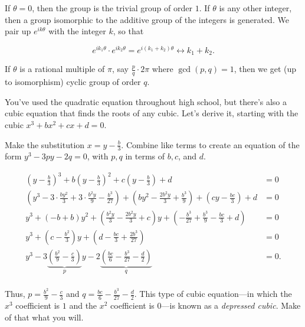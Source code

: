 \documentclass[../key.tex]{subfiles}
\begin{document}
If $\theta=0$, then the group is the trivial group of order $1$. If $\theta$ is any other integer, then a group isomorphic to the additive group of the integers is generated. We pair up $e^{ik\theta}$ with the integer $k$, so that

$$e^{ik_1\theta}\cdot e^{ik_2\theta} = e^{i(k_1+k_2)\theta} \leftrightarrow k_1+k_2.$$

If $\theta$ is a rational multiple of $\pi$, say $\frac{p}{q}\cdot 2\pi$ where $\gcd(p,q)=1$, then we get (up to isomorphism) cyclic group of order $q$.

\begin{outer_problem}
\item You've used the quadratic equation throughout high school, but there's also a cubic equation that finds the roots of any cubic. Let's derive it, starting with the cubic $x^3+bx^2+cx+d=0$.
\end{outer_problem}

\begin{inner_problem}[start=1]
\item Make the substitution $x=y-\frac{b}{3}$. Combine like terms to create an equation of the form $y^3-3py-2q=0$, with $p,q$ in terms of $b,c$, and $d$.
\end{inner_problem}

\begin{align*}
\left(y-\frac{b}{3}\right)^3+b\left(y-\frac{b}{3}\right)^2+c\left(y-\frac{b}{3}\right)+d&=0 \\
\left(y^{3}-3\cdot\frac{by^2}{3}+3\cdot\frac{b^2y}{9}-\frac{b^3}{27}\right) +\left(by^2-\frac{2b^2y}{3}+\frac{b^3}{9}\right) + \left(cy-\frac{bc}{3}\right) + d &= 0 \\
y^3 + \left(-b+b\right)y^2 + \left(\frac{b^2y}{3} - \frac{2b^2y}{3} + c\right)y + \left(-\frac{b^3}{27}+\frac{b^3}{9}-\frac{bc}{3}+d\right) &= 0 \\
y^3 + \left(c-\frac{b^2}{3}\right)y + \left(d - \frac{bc}{3} + \frac{2b^3}{27}\right) &= 0 \\
y^3 - 3\underbrace{\left(\frac{b^2}{9} - \frac{c}{3}\right)}_{p}y - 2 \underbrace{\left(\frac{bc}{6} - \frac{b^3}{27} - \frac{d}{2}\right)}_{q} &= 0. \\
\end{align*}

Thus, $p = \frac{b^2}{9} - \frac{c}{3}$ and $q=\frac{bc}{6} - \frac{b^3}{27} - \frac{d}{2}$. This type of cubic equation---in which the $x^3$ coefficient is $1$  and the $x^2$ coefficient is $0$---is known as a \textit{depressed cubic}. Make of that what you will.
\end{document}
